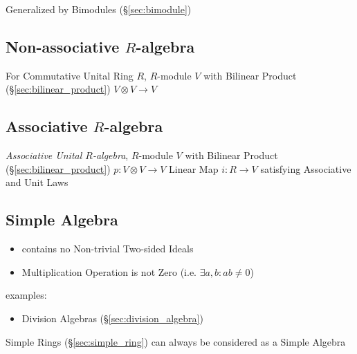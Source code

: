 {{Generalized by Bimodules (\S\ref{sec:bimodule})



\subsection{Non-associative $R$-algebra}
\label{sec:nonassociative_r_algebra}

For Commutative Unital Ring $R$, $R$-module $V$ with Bilinear Product
(\S\ref{sec:bilinear_product}) $V \otimes V \rightarrow V$



\subsection{Associative $R$-algebra}\label{sec:associative_r_algebra}

\emph{Associative Unital $R$-algebra}, $R$-module $V$ with Bilinear
Product (\S\ref{sec:bilinear_product}) $p : V \otimes V \rightarrow V$
Linear Map $i : R \rightarrow V$ satisfying Associative and Unit Laws



\subsection{Simple Algebra}\label{sec:simple_algebra}

\begin{itemize}
  \item contains no Non-trivial Two-sided Ideals
  \item Multiplication Operation is not Zero (i.e. $\exists a, b : ab \neq 0$)
\end{itemize}

examples:
\begin{itemize}
  \item Division Algebras (\S\ref{sec:division_algebra})
\end{itemize}

Simple Rings (\S\ref{sec:simple_ring}) can always be considered as a Simple
Algebra



}}
